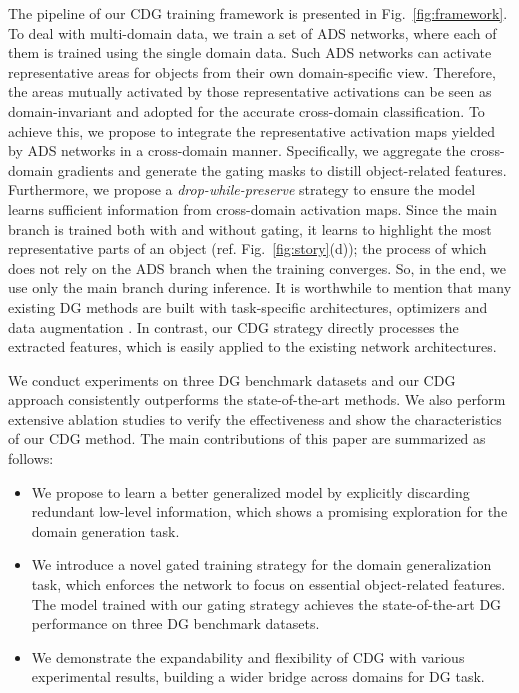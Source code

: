 The pipeline of our CDG training framework is presented in Fig.~\ref{fig:framework}. To deal with multi-domain data, we train a set of ADS networks, where each of them is trained using the single domain data. Such ADS networks can activate representative areas for objects from their own domain-specific view. Therefore, the areas mutually activated by those representative activations can be seen as domain-invariant and adopted for the accurate cross-domain classification. To achieve this, we propose to integrate the representative activation maps yielded by ADS networks in a cross-domain manner. Specifically, we aggregate the cross-domain gradients and generate the gating masks to distill object-related features. Furthermore, we propose a \textit{drop-while-preserve} strategy to ensure the model learns sufficient information from cross-domain activation maps. Since the main branch is trained both with and without gating, it learns to highlight the most representative parts of an object (ref. Fig.~\ref{fig:story}(d)); the process of which does not rely on the ADS branch when the training converges. So, in the end, we use only the main branch during inference. It is worthwhile to mention that many existing DG methods are built with task-specific architectures, optimizers and data augmentation \citep{li2017deeper,li2017learning,shankar2018generalizing}. In contrast, our CDG strategy directly processes the extracted features, which is easily applied to the existing network architectures. 

We conduct experiments on three DG benchmark datasets and our CDG approach consistently outperforms the state-of-the-art methods. We also perform extensive ablation studies to verify the effectiveness and show the characteristics of our CDG method. The main contributions of this paper are summarized as follows:

\begin{itemize}
  \item We propose to learn a better generalized model by explicitly discarding redundant low-level information, which shows a promising exploration for the domain generation task.

  \item We introduce a novel gated training strategy for the domain generalization task, which enforces the network to focus on essential object-related features. The model trained with our gating strategy achieves the state-of-the-art DG performance on three DG benchmark datasets.

  \item We demonstrate the expandability and flexibility of CDG with various experimental results, building a wider bridge across domains for DG task.
\end{itemize}


